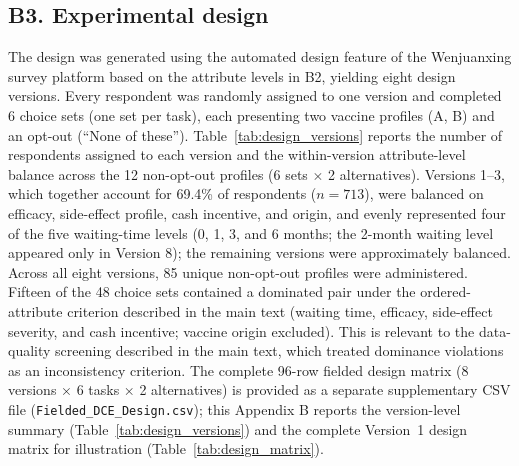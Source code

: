 \subsection*{B3. Experimental design}

The design was generated using the automated design feature of the Wenjuanxing survey platform based on the attribute levels in B2, yielding eight design versions. Every respondent was randomly assigned to one version and completed 6 choice sets (one set per task), each presenting two vaccine profiles (A, B) and an opt-out (``None of these''). Table~\ref{tab:design_versions} reports the number of respondents assigned to each version and the within-version attribute-level balance across the 12 non-opt-out profiles (6 sets $\times$ 2 alternatives). Versions 1--3, which together account for 69.4\% of respondents ($n = 713$), were balanced on efficacy, side-effect profile, cash incentive, and origin, and evenly represented four of the five waiting-time levels (0, 1, 3, and 6 months; the 2-month waiting level appeared only in Version 8); the remaining versions were approximately balanced. Across all eight versions, 85 unique non-opt-out profiles were administered. Fifteen of the 48 choice sets contained a dominated pair under the ordered-attribute criterion described in the main text (waiting time, efficacy, side-effect severity, and cash incentive; vaccine origin excluded). This is relevant to the data-quality screening described in the main text, which treated dominance violations as an inconsistency criterion. The complete 96-row fielded design matrix (8 versions $\times$ 6 tasks × 2 alternatives) is provided as a separate supplementary CSV file (\texttt{Fielded\_DCE\_Design.csv}); this Appendix B reports the version-level summary (Table~\ref{tab:design_versions}) and the complete Version~1 design matrix for illustration (Table~\ref{tab:design_matrix}).


